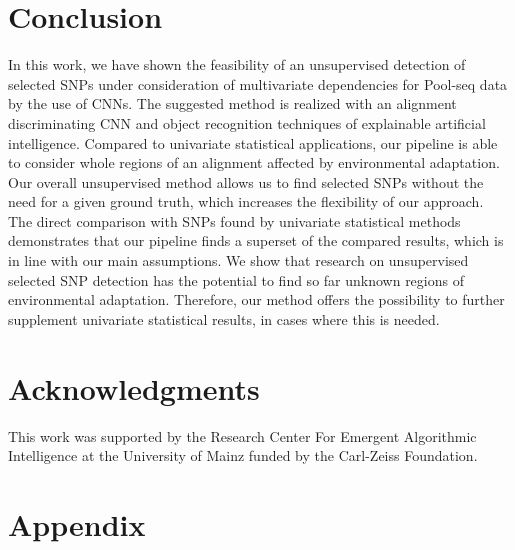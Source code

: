 \documentclass{article}
\begin{document}
\section{Conclusion}
\label{conclusion}
In this work, we have shown the feasibility of an unsupervised detection of selected SNPs under consideration of multivariate dependencies for Pool-seq data by the use of CNNs. %
The suggested method is realized with an alignment discriminating CNN and object recognition techniques of explainable artificial intelligence.
Compared to univariate statistical applications, our pipeline is able to consider whole regions of an alignment affected by environmental adaptation. Our overall unsupervised method allows us to find selected SNPs without the need for a given ground truth, which increases the flexibility of our approach.
The direct comparison with SNPs found by univariate statistical methods demonstrates that our pipeline finds a superset of the compared results, which is in line with our main assumptions. 
We show that research on unsupervised selected SNP detection has the potential to find so far unknown regions of environmental adaptation. Therefore, our method offers the possibility to further supplement univariate statistical results, in cases where this is needed.
\section*{Acknowledgments}
This work was supported by the Research Center
For Emergent Algorithmic Intelligence at the University of Mainz funded by the Carl-Zeiss Foundation.
%
  

\appendix
\section{Appendix}
\end{document}
